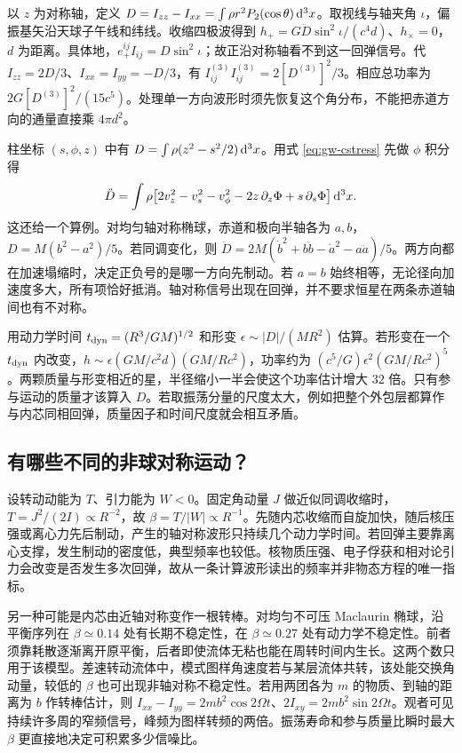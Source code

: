 以 $z$ 为对称轴，定义 $D=I_{zz}-I_{xx}=\int\rho r^2P_2(\cos\theta)\,\dd^3x$。取视线与轴夹角 $\iota$，偏振基矢沿天球子午线和纬线。收缩四极波得到 $h_+=G\ddot D\sin^2\iota/(c^4 d)$、$h_\times=0$，$d$ 为距离。具体地，$e_+^{ij}I_{ij}=D\sin^2\iota$；故正沿对称轴看不到这一回弹信号。代 $I_{zz}=2D/3$、$I_{xx}=I_{yy}=-D/3$，有 $I^{(3)}_{ij}I^{(3)}_{ij}=2[D^{(3)}]^2/3$。相应总功率为 $2G[D^{(3)}]^2/(15c^5)$。处理单一方向波形时须先恢复这个角分布，不能把赤道方向的通量直接乘 $4\pi d^2$。

柱坐标 $(s,\phi,z)$ 中有 $D=\int\rho(z^2-s^2/2)\,\dd^3x$。用式 \eqref{eq:gw-cstress} 先做 $\phi$ 积分得
\[
 \ddot D=\int\rho\big[2v_z^2-v_s^2-v_\phi^2
                   -2z\,\partial_z\Phi+s\,\partial_s\Phi\big]\,\dd^3x .
\]
这还给一个算例。对均匀轴对称椭球，赤道和极向半轴各为 $a,b$，$D=M(b^2-a^2)/5$。若同调变化，则 $\ddot D=2M(\dot b^2+b\ddot b-\dot a^2-a\ddot a)/5$。两方向都在加速塌缩时，决定正负号的是哪一方向先制动。若 $a=b$ 始终相等，无论径向加速度多大，所有项恰好抵消。轴对称信号出现在回弹，并不要求恒星在两条赤道轴间也有不对称。

用动力学时间 $t_{\rm dyn}=(R^3/GM)^{1/2}$ 和形变 $\epsilon\sim|D|/(MR^2)$ 估算。若形变在一个 $t_{\rm dyn}$ 内改变，$h\sim \epsilon(GM/c^2d)(GM/Rc^2)$，功率约为 $(c^5/G)\epsilon^2(GM/Rc^2)^5$。两颗质量与形变相近的星，半径缩小一半会使这个功率估计增大 $32$ 倍。只有参与运动的质量才该算入 $D$。若取振荡分量的尺度太大，例如把整个外包层都算作与内芯同相回弹，质量因子和时间尺度就会相互矛盾。

\subsection{有哪些不同的非球对称运动？}

设转动动能为 $T$、引力能为 $W<0$。固定角动量 $J$ 做近似同调收缩时，$T=J^2/(2I)\propto R^{-2}$，故 $\beta=T/|W|\propto R^{-1}$。先随内芯收缩而自旋加快，随后核压强或离心力先后制动，产生的轴对称波形只持续几个动力学时间。若回弹主要靠离心支撑，发生制动的密度低，典型频率也较低。核物质压强、电子俘获和相对论引力会改变是否发生多次回弹，故从一条计算波形读出的频率并非物态方程的唯一指标。

另一种可能是内芯由近轴对称变作一根转棒。对均匀不可压 Maclaurin 椭球，沿平衡序列在 $\beta\simeq0.14$ 处有长期不稳定性，在 $\beta\simeq0.27$ 处有动力学不稳定性。前者须靠耗散逐渐离开原平衡，后者即使流体无粘也能在周转时间内生长。这两个数只用于该模型。差速转动流体中，模式图样角速度若与某层流体共转，该处能交换角动量，较低的 $\beta$ 也可出现非轴对称不稳定性。若用两团各为 $m$ 的物质、到轴的距离为 $b$ 作转棒估计，则 $I_{xx}-I_{yy}=2mb^2\cos 2\Omega t$、$2I_{xy}=2mb^2\sin2\Omega t$。观者可见持续许多周的窄频信号，峰频为图样转频的两倍。振荡寿命和参与质量比瞬时最大 $\beta$ 更直接地决定可积累多少信噪比。

